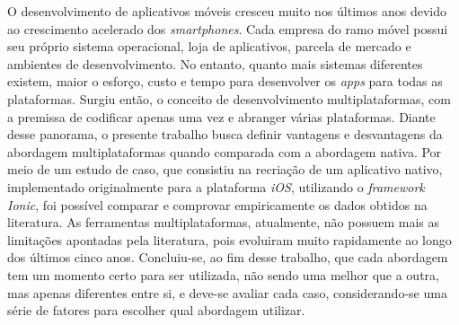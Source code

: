 \begin{resumo}
\begin{comment}
 O resumo deve ressaltar o objetivo, o método, os resultados e as conclusões 
 do documento. A ordem e a extensão
 destes itens dependem do tipo de resumo (informativo ou indicativo) e do
 tratamento que cada item recebe no documento original. O resumo deve ser
 precedido da referência do documento, com exceção do resumo inserido no
 próprio documento. (\ldots) As palavras-chave devem figurar logo abaixo do
 resumo, antecedidas da expressão Palavras-chave:, separadas entre si por
 ponto e finalizadas também por ponto. O texto pode conter no mínimo 150 e 
 no máximo 500 palavras, é aconselhável que sejam utilizadas 200 palavras. 
 E não se separa o texto do resumo em parágrafos.

 O desenvolvimento de aplicativos móveis cresceu muito nos últimos anos
 devido ao crescimento acelerado dos \textit{smartphones}. Com isso, surgiram 
 lojas de aplicativos, ambientes e \textit{SDK's} diferentes para 
 cada sistema operacional móvel. No entanto, quanto mais sistemas diferentes 
 existem, maior o esforço para desenvolver os \textit{apps} para todas 
 as plataformas. Com essa gama de plataformas diferentes, invariavelmente,
 o desenvolvedor precisará escolher qual plataforma irá seguir. Surge, então, uma forma 
 de desenvolvimento com a premissa de resolver 
 o problema da criação de um \textit{apps} para cada plataforma. 
 Essa solução ficou conhecida como desenvolvimento multiplataformas e possui
 vantagens e desvantagens em relação ao desenvolvimento nativo. Será feita uma
 pesquisa e um estudo de caso para avaliar essas vantagens e desvantagens de 
 maneira empírica e assim definir uma forma de escolher qual abordagem deve ser 
 adotada em cada caso específico.
\end{comment}

 O desenvolvimento de aplicativos móveis cresceu muito nos últimos anos devido ao crescimento acelerado dos \textit{smartphones}. Cada empresa
 do ramo móvel possui seu próprio sistema operacional, loja de aplicativos, parcela de mercado e ambientes de desenvolvimento. No entanto, quanto mais 
 sistemas diferentes existem, maior o esforço, custo e tempo para desenvolver os \textit{apps} para todas as plataformas. Surgiu então, o conceito de desenvolvimento multiplataformas,
 com a premissa de codificar apenas uma vez e abranger várias plataformas. Diante desse panorama, o presente trabalho busca definir vantagens e desvantagens da abordagem
 multiplataformas quando comparada com a abordagem nativa. Por meio de um estudo de caso, que consistiu na recriação de um aplicativo nativo, implementado originalmente para a plataforma \textit{iOS},
 utilizando o \textit{framework Ionic}, foi possível comparar e comprovar empiricamente os dados obtidos na literatura. As ferramentas multiplataformas, atualmente,
 não possuem mais as limitações apontadas pela literatura, pois evoluiram muito rapidamente ao longo dos últimos cinco anos. Concluiu-se, ao fim desse trabalho, que cada abordagem tem um momento certo
 para ser utilizada, não sendo uma melhor que a outra, mas apenas diferentes entre si, e deve-se avaliar cada caso, considerando-se uma série de fatores para escolher qual abordagem utilizar.


\end{resumo}
